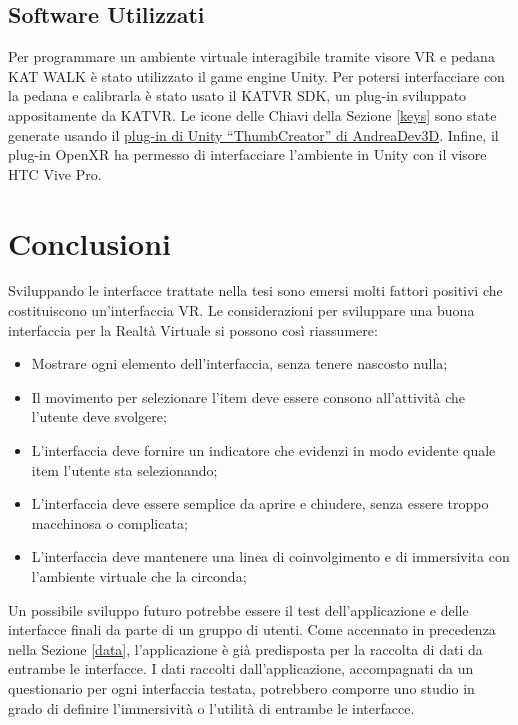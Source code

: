 \documentclass[target=bach,aauheader=]{thud}
\begin{document}
\section{Software Utilizzati}
Per programmare un ambiente virtuale interagibile tramite visore VR e pedana KAT WALK è stato utilizzato il game engine Unity.
Per potersi interfacciare con la pedana e calibrarla è stato usato il KATVR SDK, un plug-in sviluppato appositamente da KATVR.
Le icone delle Chiavi della Sezione \ref{keys} sono state generate usando il \href{https://github.com/AndreaDev3D/ThumbCreator}{plug-in di Unity “ThumbCreator” di AndreaDev3D}.
Infine, il plug-in OpenXR ha permesso di interfacciare l'ambiente in Unity con il visore HTC Vive Pro.


\chapter{Conclusioni} %
Sviluppando le interfacce trattate nella tesi sono emersi molti fattori positivi che costituiscono un'interfaccia VR.
Le considerazioni per sviluppare una buona interfaccia per la Realtà Virtuale si possono così riassumere:
\begin{itemize}
    \item Mostrare ogni elemento dell'interfaccia, senza tenere nascosto nulla;
    \item Il movimento per selezionare l'item deve essere consono all'attività che l'utente deve svolgere;
    \item L'interfaccia deve fornire un indicatore che evidenzi in modo evidente quale item l'utente sta selezionando;
    \item L'interfaccia deve essere semplice da aprire e chiudere, senza essere troppo macchinosa o complicata;
    \item L'interfaccia deve mantenere una linea di coinvolgimento e di immersivita con l'ambiente virtuale che la circonda; \\
\end{itemize}

Un possibile sviluppo futuro potrebbe essere il test dell'applicazione e delle interfacce finali da parte di un gruppo di utenti.
Come accennato in precedenza nella Sezione \ref{data}, l'applicazione è già predisposta per la raccolta di dati da entrambe le interfacce.
I dati raccolti dall'applicazione, accompagnati da un questionario per ogni interfaccia testata, potrebbero comporre uno studio in grado di definire l'immersività o l'utilità di entrambe le interfacce. \\
\end{document}
